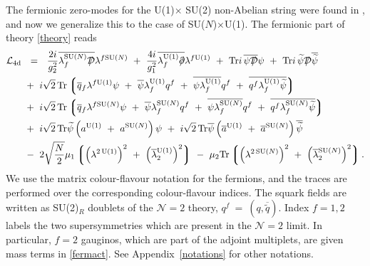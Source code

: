 \documentclass[12pt]{article}
\def\Tr{{\rm Tr}}
\newcommand{\ntwo}{${\mathcal N}=2$ }
\newcommand{\p}{\partial}
\newcommand{\wt}{\widetilde}
\newcommand{\ov}{\overline}
\newcommand{\mc}[1]{\mathcal{#1}}
\newcommand{\md}{\mathcal{D}}
\newcommand{\lgr}{\left\lgroup}
\newcommand{\rgr}{\right\rgroup}
\def\slashed#1{\setbox0=\hbox{$#1$}             %
   \dimen0=\wd0                                 %
   \setbox1=\hbox{/} \dimen1=\wd1               %
   \ifdim\dimen0>\dimen1                        %
      \rlap{\hbox to \dimen0{\hfil/\hfil}}      %
      #1                                        %
   \else                                        %
      \rlap{\hbox to \dimen1{\hfil$#1$\hfil}}   %
      /                                         %
   \fi}                                        %
\newcommand{\aU}{a^{\rm U(1)}}
\newcommand{\aN}{a^\text{SU($N$)}}
\newcommand{\baU}{\ov{a}{}^{\rm U(1)}}
\newcommand{\baN}{\ov{a}{}^\text{SU($N$)}}
\newcommand{\lU}{\lambda^{\rm U(1)}}
\newcommand{\lN}{\lambda^\text{SU($N$)}}
\begin{document}
	The fermionic zero-modes for the U(1)$ \times $ SU(2) non-Abelian string were found in \cite{SYhet}, 
	and now we generalize this to the case of SU($N$)$\times$U(1).
	The fermionic part of theory \eqref{theory} reads
\begin{align}
%
\notag
\mc{L}_{\rm 4d} & ~~=~~ \frac{2i}{g_2^2} \ov{\lN_f \slashed{\md}} \lambda^{f\text{SU($N$)}}
		~+~ \frac{4i}{g_1^2} \ov{\lU_f \slashed{\p}} \lambda^{f{\rm U(1)}}
		~+~ \Tr i\, \ov{\psi \slashed{\md}} \psi  
		~+~ \Tr i\, \wt{\psi} \slashed{\md} \ov{\wt{\psi}}
		\\
%
\notag
		& 
		~+~
		i\sqrt{2}\, \Tr \lgr \ov{q}{}_f \lambda^{f{\rm U(1)}}\psi 
				  ~+~ \ov{\psi} \lU_f q^f  
				  ~+~ \ov{\psi \lU_f} q^f
				  ~+~ \ov{q^f \lU_f \wt{\psi}} 
				\rgr
		\\
%
\label{fermact}
		&
		~+~
		i\sqrt{2}\, \Tr \lgr \ov{q}{}_f \lambda^{f\text{SU($N$)}} \psi 
					~+~ \ov{\psi} \lN_f q^f
					~+~ \ov{\psi \lN_f} q^f
					~+~ \ov{q^f \lN_f \wt{\psi}}
				\rgr
		\\
%
\notag
		&
		~+~
		i\sqrt{2}\, \Tr \wt{\psi} \left( \aU ~+~ \aN \right) \psi  
		~+~ 
		i\sqrt{2}\, \Tr \ov{\psi} \left( \baU ~+~ \baN \right) \ov{\wt{\psi}}
		\\
%
\notag
		&
		~-~
		2 \sqrt{\frac{N}{2}} \mu_1 \lgr \left( \lambda^{2\,{\rm U(1)}} \right)^2 
  					    ~+~ \left( \ov{\lambda}{}^{\rm U(1)}_2 \right)^2 \rgr
		~-~
		\mu_2 \Tr \lgr \left( \lambda^{2\,\text{SU($N$)}} \right)^2
			   ~+~ \left( \ov{\lambda}{}^\text{SU($N$)}_2 \right)^2 \rgr.
\end{align}
	We use the matrix colour-flavour notation for the fermions, and the traces are performed
	over the corresponding colour-flavour indices.
	The squark fields are written as SU(2)$_R$ doublets of the \ntwo theory,
	$ q^f ~=~ (q, \ov{\wt{q}}) $. 
	Index $ f = 1, 2 $ labels the two supersymmetries which are present in the \ntwo limit. 
	In particular, $ f = 2 $ gauginos, which are part of the adjoint multiplets, are given mass terms in \eqref{fermact}.
	See Appendix~\ref{notations} for other notations.
	
\end{document}
